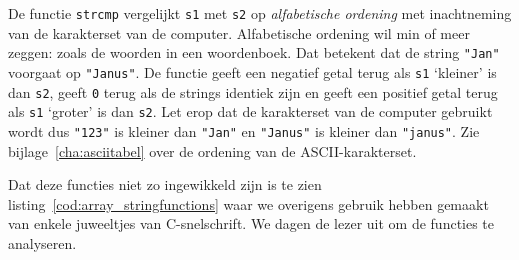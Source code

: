 De functie \texttt{strcmp} vergelijkt \texttt{s1} met \texttt{s2} op \textsl{alfabetische ordening} met inachtneming van de karakterset van de computer. Alfabetische ordening wil min of meer zeggen: zoals de woorden in een woordenboek. Dat betekent dat de string \texttt{"Jan"} voorgaat op \texttt{"Janus"}. De functie geeft een negatief getal terug als \texttt{s1} `kleiner' is dan \texttt{s2}, geeft \texttt{0} terug als de strings identiek zijn en geeft een positief getal terug als \texttt{s1} `groter' is dan \texttt{s2}. Let erop dat de karakterset van de computer gebruikt wordt dus \texttt{"123"} is kleiner dan \texttt{"Jan"} en \texttt{"Janus"} is kleiner dan \texttt{"janus"}. Zie bijlage~\ref{cha:asciitabel} over de ordening van de ASCII-karakterset.

Dat deze functies niet zo ingewikkeld zijn is te zien listing~\ref{cod:array_stringfunctions} waar we overigens gebruik hebben gemaakt van enkele juweeltjes van C-snelschrift. We dagen de lezer uit om de functies te analyseren.

